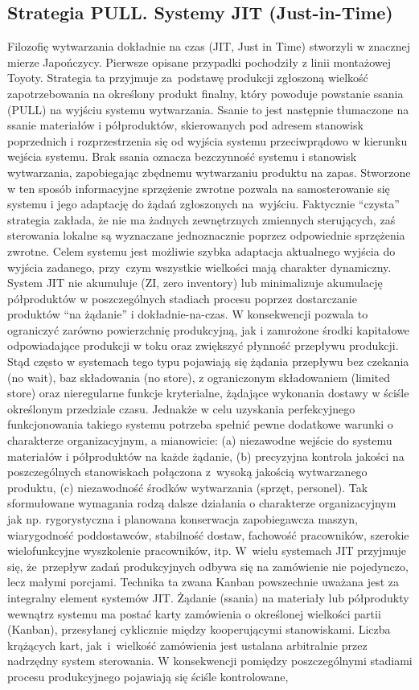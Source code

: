 \documentclass[10pt, a
4paper]{article}
\begin{document}
\subsection{Strategia PULL. Systemy JIT (Just-in-Time)}
Filozofię wytwarzania dokładnie na czas (JIT, Just in Time) stworzyli w znacznej mierze Japończycy. Pierwsze opisane
przypadki pochodziły z linii montażowej Toyoty. Strategia ta przyjmuje za~podstawę produkcji zgłoszoną wielkość zapotrzebowania na określony produkt finalny, który powoduje powstanie ssania (PULL) na wyjściu systemu wytwarzania. Ssanie to jest następnie tłumaczone na ssanie materiałów i półproduktów, skierowanych pod adresem stanowisk poprzednich i rozprzestrzenia się od wyjścia systemu przeciwprądowo w kierunku wejścia systemu. Brak ssania oznacza bezczynność systemu i stanowisk wytwarzania, zapobiegając zbędnemu wytwarzaniu produktu na zapas. Stworzone w ten sposób informacyjne sprzężenie zwrotne pozwala na samosterowanie się systemu i jego adaptację do żądań zgłoszonych na~wyjściu. Faktycznie “czysta” strategia zakłada, że nie ma żadnych zewnętrznych zmiennych sterujących, zaś sterowania lokalne są wyznaczane jednoznacznie poprzez odpowiednie sprzężenia zwrotne. Celem systemu jest możliwie szybka adaptacja aktualnego wyjścia do wyjścia zadanego, przy~czym wszystkie wielkości mają charakter dynamiczny. System JIT nie akumuluje (ZI, zero inventory) lub minimalizuje akumulację półproduktów w poszczególnych stadiach procesu poprzez dostarczanie produktów “na żądanie” i dokładnie-na-czas. W konsekwencji pozwala to ograniczyć zarówno powierzchnię produkcyjną, jak i zamrożone środki kapitałowe odpowiadające produkcji w toku oraz zwiększyć płynność przepływu produkcji. Stąd często w systemach tego typu pojawiają się żądania przepływu bez czekania (no wait), baz składowania (no store), z ograniczonym składowaniem (limited store) oraz nieregularne funkcje kryterialne, żądające wykonania dostawy w ściśle określonym przedziale czasu. Jednakże w celu uzyskania perfekcyjnego funkcjonowania takiego systemu potrzeba spełnić pewne dodatkowe warunki o charakterze organizacyjnym, a mianowicie: (a) niezawodne wejście do systemu materiałów i półproduktów na każde żądanie, (b) precyzyjna kontrola jakości na poszczególnych stanowiskach połączona z~wysoką jakością wytwarzanego produktu, (c) niezawodność środków wytwarzania (sprzęt, personel). Tak sformułowane wymagania rodzą dalsze działania o charakterze organizacyjnym jak np. rygorystyczna i planowana konserwacja zapobiegawcza maszyn, wiarygodność poddostawców, stabilność dostaw, fachowość pracowników, szerokie wielofunkcyjne wyszkolenie pracowników, itp. W~wielu systemach JIT przyjmuje się, że~przepływ zadań produkcyjnych odbywa się na zamówienie nie pojedynczo, lecz małymi porcjami. Technika ta zwana Kanban powszechnie uważana jest za integralny element systemów JIT. Żądanie (ssania) na materiały lub półprodukty wewnątrz systemu ma postać karty zamówienia o określonej wielkości partii (Kanban), przesyłanej cyklicznie między kooperującymi stanowiskami. Liczba krążących kart, jak~i~wielkość zamówienia jest ustalana arbitralnie przez nadrzędny system sterowania. W konsekwencji pomiędzy poszczególnymi stadiami procesu produkcyjnego pojawiają się ściśle kontrolowane, 
\end{document}

